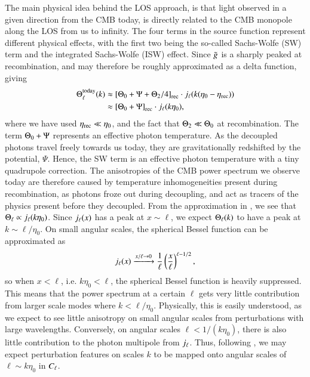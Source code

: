 The main physical idea behind the LOS approach, is that light observed in a given direction from the CMB today, is directly related to the CMB monopole along the LOS from us to infinity. The four terms in the source function represent different physical effects, with the first two being the so-called Sachs-Wolfe (SW) term and the integrated Sachs-Wolfe (ISW) effect. Since $\tilde{g}$ is a sharply peaked at recombination, and may therefore be roughly approximated as a delta function, giving   
\begin{equation} \label{eq:M4:theory:Theta_ell_today_SW_approximation}
    \begin{split}
        \Theta_\ell^\mathrm{today}(k)&\approx \left[ \Theta_0 + \Psi + \Theta_2/4 \right]_\mathrm{rec}\cdot j_\ell(k(\eta_0-\eta_\mathrm{rec})) \\ 
        &\approx\left[ \Theta_0 + \Psi \right]_\mathrm{rec}\cdot j_\ell(k\eta_0) , 
    \end{split}
\end{equation}
where we have used $\eta_\mathrm{rec}\ll\eta_0$, and the fact that $\Theta_2\ll\Theta_0$ at recombination. The term $\Theta_0+\Psi$ represents an effective photon temperature. As the decoupled photons travel freely towards us today, they are gravitationally redshifted by the potential, $\Psi$. Hence, the SW term is an effective photon temperature with a tiny quadrupole correction. The anisotropies of the CMB power spectrum we observe today are therefore caused by temperature inhomogeneities present during recombination, as photons froze out during decoupling, and act as tracers of the physics present before they decoupled.  From the approximation in , we see that $\Theta_\ell\propto j_\ell(k\eta_0)$. Since $j_\ell(x)$ has a peak at $x\sim\ell$, we expect $\Theta_\ell(k)$ to have a peak at $k\sim\ell/\eta_0$. On small angular scales, the spherical Bessel function can be approximated as \cite[Eq. (9.61)]{Dodelson}
\begin{equation}
    j_\ell(x) \xrightarrow{x/\ell\to0} \frac{1}{\ell}\left( \frac{x}{\ell} \right)^{\ell-1/2},
\end{equation} 
so when $x<\ell$, i.e. $k\eta_0<\ell$, the spherical Bessel function is heavily suppressed. This means that the power spectrum at a certain $\ell$ gets very little contribution from larger scale modes where $k<\ell/\eta_0$. Physically, this is easily understood, as we expect to see little anisotropy on small angular scales from perturbations with large wavelengths. Conversely, on angular scales $\ell<1/(k\eta_0)$, there is also little contribution to the photon multipole from $j_\ell$. Thus, following , we may expect perturbation features on scales $k$ to be mapped onto angular scales of $\ell\sim k\eta_0$ in $C_\ell$.

